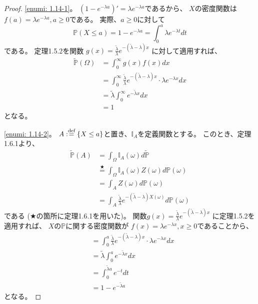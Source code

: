 \documentclass[uplatex]{jsarticle}
\theoremstyle{definition}
\def\P{\mathbb{P}}
\def\I{\mathbb{I}}
\def\dfn{:\overset{\mbox{{\scriptsize def}}}{=}}
\begin{document}
\begin{proof}
  \ref{enumi: 1.14-1}。
  \((1-e^{-\lambda a})' = \lambda e^{-\lambda a}\)であるから、
  \(X\)の密度関数は\(f(a) = \lambda e^{-\lambda a} , a \geq 0\)である。
  実際、\(a \geq 0\)に対して
  \[
  \P(X \leq a) = 1-e^{-\lambda a} = \int_0^a \lambda e^{-\lambda t} dt
  \]
  である。
  定理1.5.2を関数
  \(g(x) = \frac{\tilde{\lambda}}{\lambda}e^{-(\tilde{\lambda}-\lambda)x}\)
  に対して適用すれば、
  \begin{align*}
    \tilde{\P}(\Omega)
    &= \int_0^{\infty} g(x)f(x) dx \\
    &= \int_0^{\infty} \frac{\tilde{\lambda}}{\lambda}e^{-(\tilde{\lambda}-\lambda)x}
    \cdot \lambda e^{-\lambda x} dx \\
    &= \tilde{\lambda}\int_0^{\infty} e^{-\tilde{\lambda}x} dx \\
    &= 1
  \end{align*}
  となる。

  \ref{enumi: 1.14-2}。
  \(A \dfn \left\{ X \leq a \right\}\)と置き、\(\I_A\)を定義関数とする。
  このとき、定理1.6.1より、
  \begin{align*}
    \tilde{\P}(A) &= \int_{\Omega}\I_A(\omega)d\tilde{\P} \\
    &\overset{\bigstar}{=} \int_{\Omega}\I_A(\omega)Z(\omega)d\P(\omega) \\
    &= \int_{A}Z(\omega)d\P(\omega) \\
    &= \int_{A}
    \frac{\tilde{\lambda}}{\lambda}e^{-(\tilde{\lambda}-\lambda)X(\omega)}
    d\P(\omega)
  \end{align*}
  である (\(\bigstar\)の箇所に定理1.6.1を用いた)。
  関数\(g(x) = \frac{\tilde{\lambda}}{\lambda}e^{-(\tilde{\lambda}-\lambda)x}\)
  に定理1.5.2を適用すれば、
  \(X\)の\(\P\)に関する密度関数が
  \(f(x) = \lambda e^{-\lambda x} , x \geq 0\)であることから、
  \begin{align*}
    &= \int_0^a
    \frac{\tilde{\lambda}}{\lambda}e^{-(\tilde{\lambda}-\lambda)x}
    \cdot \lambda e^{-\lambda x}dx \\
    &= \tilde{\lambda}\int_0^a e^{-\tilde{\lambda}x}dx \\
    &= \int_0^{\tilde{\lambda}a} e^{-t}dt \\
    &= 1-e^{-\tilde{\lambda}a}
  \end{align*}
  となる。
\end{proof}
\end{document}
